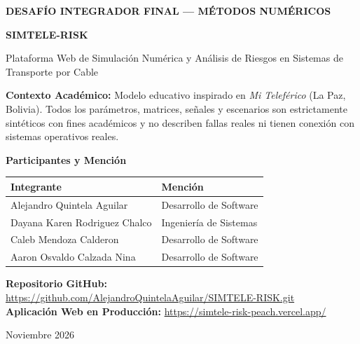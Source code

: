 \documentclass[11pt,a4paper]{article}
\begin{document}
\begin{titlepage}
    \centering
    \vspace*{1.5cm}
    {\Large \textbf{DESAFÍO INTEGRADOR FINAL — MÉTODOS NUMÉRICOS}\par}
    \vspace{0.8cm}
    {\Huge \textbf{\textcolor{primary}{SIMTELE-RISK}}\par}
    \vspace{0.4cm}
    {\Large Plataforma Web de Simulación Numérica y Análisis de Riesgos en Sistemas de Transporte por Cable\par}
    \vspace{1.2cm}
    \begin{tcolorbox}[colback=softbg,colframe=primary,width=0.9\textwidth]
        \centering
        \textbf{Contexto Académico:} Modelo educativo inspirado en \textit{Mi Teleférico} (La Paz, Bolivia). Todos los parámetros, matrices, señales y escenarios son estrictamente sintéticos con fines académicos y no describen fallas reales ni tienen conexión con sistemas operativos reales.
    \end{tcolorbox}
    \vspace{1.5cm}

    \textbf{\large Participantes y Mención}\\[0.5cm]
    \begin{tabular}{ll}
        \toprule
        \textbf{Integrante} & \textbf{Mención} \\
        \midrule
        Alejandro Quintela Aguilar & Desarrollo de Software \\
        Dayana Karen Rodriguez Chalco & Ingeniería de Sistemas \\
        Caleb Mendoza Calderon & Desarrollo de Software \\
        Aaron Osvaldo Calzada Nina & Desarrollo de Software \\
        \bottomrule
    \end{tabular}

    \vfill
    \textbf{Repositorio GitHub:} \url{https://github.com/AlejandroQuintelaAguilar/SIMTELE-RISK.git}\\
    \textbf{Aplicación Web en Producción:} \url{https://simtele-risk-peach.vercel.app/}\\[0.5cm]
    {\large Noviembre 2026\par}
\end{titlepage}
\end{document}
